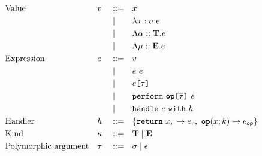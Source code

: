 \begin{figure}[h]
    \begin{align*}
         & \text{Value}                     &  & v        &  & ::=  &  & x                                                                                                    & \\
         &                                  &  &          &  & \mid &  & \lambda x : \sigma. e                                                                                & \\
         &                                  &  &          &  & \mid &  & \Lambda \alpha :: \mathbf{T}. e                                                               & \\
         &                                  &  &          &  & \mid &  & \Lambda \mu :: \mathbf{E}. e                                                                  & \\
         & \text{Expression}                &  & e        &  & ::=  &  & v                                                                                                    & \\
         &                                  &  &          &  & \mid &  & e~e                                                                                                  & \\
         &                                  &  &          &  & \mid &  & e\bktt{\tau}                                                                                        & \\
         &                                  &  &          &  & \mid &  & \texttt{perform}~\textbf{\texttt{op}}\bktt{\overline{\tau}}~e                                       & \\
         &                                  &  &          &  & \mid &  & \texttt{handle}~e~\texttt{with}~h                                                                    & \\
         & \text{Handler}                   &  & h        &  & ::=  &  & \{ \texttt{return}~x_r \mapsto e_r,\ \textbf{\texttt{op}}(x; k) \mapsto e_{\mathsf{op}} \} & \\
         & \text{Kind}                      &  & \kappa   &  & ::=  &  & \mathbf{T}\mid\mathbf{E}                                                                                 & \\
         & \text{Polymorphic argument}      &  & \tau   &  & ::=  &  & \sigma\mid\epsilon                                                                                   & \\

\end{align*}
\end{figure}
